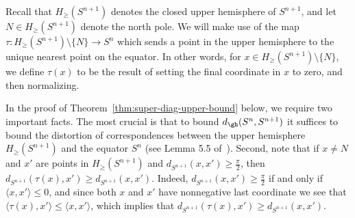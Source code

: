 \documentclass[11pt, reqno, english]{amsart}
\begin{document}
Recall that $H_\ge(S^{n+1})$ denotes the closed upper hemisphere of $S^{n+1}$, and let $N\in H_\ge(S^{n+1})$ denote the north pole.
We will make use of the map $\tau \colon H_\ge(S^{n+1})\setminus\{N\}\to S^n$ which sends a point in the upper hemisphere to the unique nearest point on the equator.
In other words, for $x\in H_{\ge}(S^{n+1})\setminus \{N\}$, we define $\tau(x)$ to be the result of setting the final coordinate in $x$ to zero, and then normalizing.

In the proof of Theorem~\ref{thm:super-diag-upper-bound} below, we require two important facts.
The most crucial is that to bound $d_\gh(S^n, S^{n+1})$ it suffices to bound the distortion of correspondences between the upper hemisphere $H_\ge(S^{n+1})$ and the equator $S^n$ (see Lemma 5.5 of~\cite{lim2021gromov}).
Second, note that if $x\neq N$ and $x'$ are points in $H_{\ge}(S^{n+1})$ and $d_{S^{n+1}}(x,x')\ge\tfrac{\pi}{2}$, then $d_{S^{n+1}}(\tau(x), x')\ge d_{S^{n+1}}(x,x')$.
Indeed, $d_{S^{n+1}}(x,x') \ge \tfrac{\pi}{2}$ if and only if $\langle x,x'\rangle \le 0$, and since both $x$ and $x'$ have nonnegative last coordinate we see that $\langle \tau(x), x'\rangle \le \langle x,x'\rangle$, which implies that $d_{S^{n+1}}(\tau(x), x') \ge d_{S^{n+1}}(x,x')$.
\end{document}
